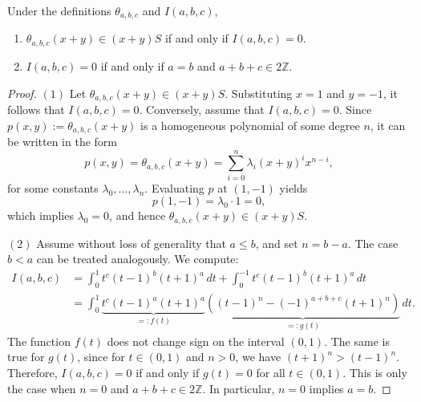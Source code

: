 \documentclass[10pt,a4paper]{amsart}
\newcommand\ZZ{{\mathbb Z}}
\begin{document}
\begin{proposition}\label{proposition:differentialformula}
Under the definitions  $\theta_{a,b,c}$ and $I(a,b,c)$, 
\begin{enumerate}
    \item $\theta_{a,b,c}(x+y)\in(x+y)S$ if and only if $I(a,b,c)=0$.
    \item $I(a,b,c)=0$ if and only if $a=b$ and $a+b+c\in2\ZZ$.
\end{enumerate}
\end{proposition}

\begin{proof}
$(1)$ Let $\theta_{a,b,c}(x+y) \in (x+y)S$. Substituting $x = 1$ and $y = -1$, it follows that $I(a,b,c) = 0$. Conversely, assume that $I(a,b,c) = 0$. Since $p(x,y) := \theta_{a,b,c}(x + y)$ is a homogeneous polynomial of some degree $n$, it can be written in the form
    $$
    p(x, y) = \theta_{a,b,c}(x + y) = \sum_{i=0}^{n} \lambda_i (x + y)^i x^{n-i},
    $$
    for some constants $\lambda_0, \ldots, \lambda_n$. Evaluating $p$ at $(1, -1)$ yields
    $$
    p(1, -1) = \lambda_0 \cdot 1 = 0,
    $$
    which implies $\lambda_0 = 0$, and hence $\theta_{a,b,c}(x + y) \in (x + y)S$.

    $(2)$ Assume without loss of generality that $a \leq b$, and set $n = b - a$. The case $b < a$ can be treated analogously. We compute:
    \begin{align*}
    I(a,b,c)
    &= \int_{0}^{1} t^c (t - 1)^b (t + 1)^a \, dt + \int_{0}^{-1} t^c (t - 1)^b (t + 1)^a \, dt \\
    &= \int_{0}^{1} 
    \underbrace{t^c (t - 1)^a (t + 1)^a}_{=: f(t)}
    \underbrace{\left((t - 1)^n - (-1)^{a + b + c} (t + 1)^n \right)}_{=: g(t)} \, dt.
    \end{align*}
    The function $f(t)$ does not change sign on the interval $(0,1)$. The same is true for $g(t)$, since for $t \in (0,1)$ and $n > 0$, we have $(t + 1)^n > (t - 1)^n$. Therefore, $I(a,b,c) = 0$ if and only if $g(t) = 0$ for all $t \in (0,1)$. This is only the case when $n = 0$ and $a + b + c \in 2\mathbb{Z}$. In particular, $n = 0$ implies $a = b$.
\end{proof}
\end{document}
